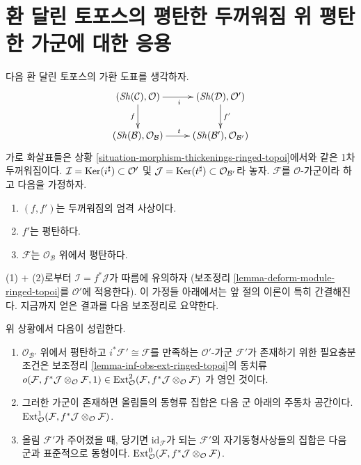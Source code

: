 \section{환 달린 토포스의 평탄한 두꺼워짐 위 평탄한 가군에 대한 응용}
\label{section-flat-ringed-topoi}

\noindent
다음 환 달린 토포스의 가환 도표를 생각하자.
$$
\xymatrix{
(\Sh(\mathcal{C}), \mathcal{O}) \ar[r]_i \ar[d]_f &
(\Sh(\mathcal{D}), \mathcal{O}') \ar[d]^{f'} \\
(\Sh(\mathcal{B}), \mathcal{O}_\mathcal{B}) \ar[r]^t &
(\Sh(\mathcal{B}'), \mathcal{O}_{\mathcal{B}'})
}
$$
가로 화살표들은 상황
\ref{situation-morphism-thickenings-ringed-topoi}에서와 같은 1차
두꺼워짐이다.
$\mathcal{I} = \mathop{\mathrm{Ker}}(i^\sharp) \subset \mathcal{O}'$ 및
$\mathcal{J} = \mathop{\mathrm{Ker}}(t^\sharp) \subset \mathcal{O}_{\mathcal{B}'}$라 놓자.
$\mathcal{F}$를 $\mathcal{O}$-가군이라 하고 다음을 가정하자.
\begin{enumerate}
\item $(f, f')$는 두꺼워짐의 엄격 사상이다.
\item $f'$는 평탄하다.
\item $\mathcal{F}$는 $\mathcal{O}_\mathcal{B}$ 위에서 평탄하다.
\end{enumerate}
(1) $+$ (2)로부터 $\mathcal{I} = f^*\mathcal{J}$가 따름에 유의하자
(보조정리 \ref{lemma-deform-module-ringed-topoi}를 $\mathcal{O}'$에
적용한다). 이 가정들 아래에서는 앞 절의 이론이 특히 간결해진다.
지금까지 얻은 결과를 다음 보조정리로 요약한다.

\begin{lemma}
\label{lemma-flat-ringed-topoi}
위 상황에서 다음이 성립한다.
\begin{enumerate}
\item $\mathcal{O}_{\mathcal{B}'}$ 위에서 평탄하고
$i^*\mathcal{F}' \cong \mathcal{F}$를 만족하는 $\mathcal{O}'$-가군
$\mathcal{F}'$가 존재하기 위한 필요충분조건은 보조정리
\ref{lemma-inf-obs-ext-ringed-topoi}의 동치류
$o(\mathcal{F}, f^*\mathcal{J} \otimes_\mathcal{O} \mathcal{F}, 1)
\in \mathop{\mathrm{Ext}}\nolimits^2_\mathcal{O}(
\mathcal{F}, f^*\mathcal{J} \otimes_\mathcal{O} \mathcal{F})$
가 영인 것이다.
\item 그러한 가군이 존재하면 올림들의 동형류 집합은 다음 군 아래의
주동차 공간이다.
$\mathop{\mathrm{Ext}}\nolimits^1_\mathcal{O}(
\mathcal{F}, f^*\mathcal{J} \otimes_\mathcal{O} \mathcal{F})$.
\item 올림 $\mathcal{F}'$가 주어졌을 때, 당기면
$\text{id}_\mathcal{F}$가 되는 $\mathcal{F}'$의 자기동형사상들의 집합은
다음 군과 표준적으로 동형이다.
$\mathop{\mathrm{Ext}}\nolimits^0_\mathcal{O}(
\mathcal{F}, f^*\mathcal{J} \otimes_\mathcal{O} \mathcal{F})$.
\end{enumerate}
\end{lemma}


